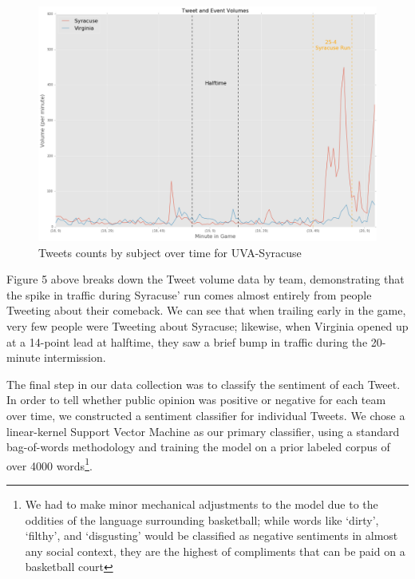 \documentclass[12pt]{article}
\begin{document}
\begin{doublespacing}
\begin{figure} [H]
	\centering
	\includegraphics[scale = 0.4] {Images/Cuse_UVA_TweetVolume.png} 
	\caption{Tweets counts by subject over time for UVA-Syracuse}
\end{figure}

Figure 5 above breaks down the Tweet volume data by team, demonstrating that the spike in traffic during Syracuse' run comes almost entirely from people Tweeting about their comeback. We can see that when trailing early in the game, very few people were Tweeting about Syracuse; likewise, when Virginia opened up at a 14-point lead at halftime, they saw a brief bump in traffic during the 20-minute intermission. 

The final step in our data collection was to classify the sentiment of each Tweet. In order to tell whether public opinion was positive or negative for each team over time, we constructed a sentiment classifier for individual Tweets. We chose a linear-kernel Support Vector Machine as our primary classifier, using a standard bag-of-words methodology and training the model on a prior labeled corpus of over 4000 words\footnote{We had to make minor mechanical adjustments to the model due to the oddities of the language surrounding basketball; while words like `dirty', `filthy', and `disgusting' would be classified as negative sentiments in almost any social context, they are the highest of compliments that can be paid on a basketball court}. 


\end{doublespacing}
\end{document}
